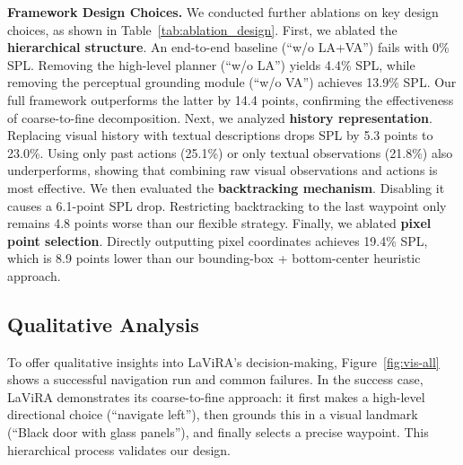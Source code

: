 \documentclass[letterpaper, 10 pt, conference]{ieeeconf}
\begin{document}
\noindent\textbf{Framework Design Choices.}
We conducted further ablations on key design choices, as shown in Table~\ref{tab:ablation_design}.
First, we ablated the \textbf{hierarchical structure}. An end-to-end baseline (``w/o LA+VA'') fails with 0\% SPL. Removing the high-level planner (``w/o LA'') yields 4.4\% SPL, while removing the perceptual grounding module (``w/o VA'') achieves 13.9\% SPL. Our full framework outperforms the latter by 14.4 points, confirming the effectiveness of coarse-to-fine decomposition.
Next, we analyzed \textbf{history representation}. Replacing visual history with textual descriptions drops SPL by 5.3 points to 23.0\%. Using only past actions (25.1\%) or only textual observations (21.8\%) also underperforms, showing that combining raw visual observations and actions is most effective.
We then evaluated the \textbf{backtracking mechanism}. Disabling it causes a 6.1-point SPL drop. Restricting backtracking to the last waypoint only remains 4.8 points worse than our flexible strategy.
Finally, we ablated \textbf{pixel point selection}. Directly outputting pixel coordinates achieves 19.4\% SPL, which is 8.9 points lower than our bounding-box + bottom-center heuristic approach.


\subsection{Qualitative Analysis}
To offer qualitative insights into LaViRA's decision-making, Figure~\ref{fig:vis-all} shows a successful navigation run and common failures. In the success case, LaViRA demonstrates its coarse-to-fine approach: it first makes a high-level directional choice (``navigate left''), then grounds this in a visual landmark (``Black door with glass panels''), and finally selects a precise waypoint. This hierarchical process validates our design. 

\end{document}
